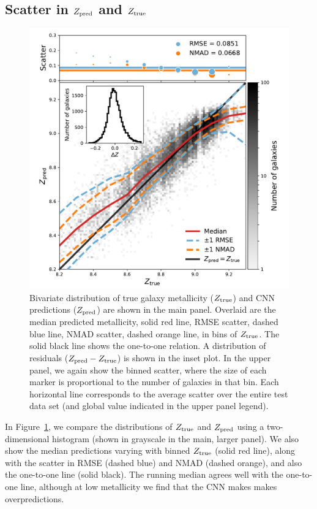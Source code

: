 \documentclass[fleqn,usenatbib]{mnras}
\begin{document}
\subsection{Scatter in $Z_{\rm pred}$ and $Z_{\rm true}$}
\begin{figure}
	\includegraphics[width=\columnwidth]{02-prediction_summary.pdf}
	\caption{\label{fig:predicting-metallicity}
		Bivariate distribution of true galaxy metallicity ($Z_{\rm true}$) and CNN predictions ($Z_{\rm pred}$) are shown in the main panel. Overlaid are the median predicted metallicity, solid red line, RMSE scatter, dashed blue line, NMAD scatter, dashed orange line, in bins of $Z_{\rm true}$. The solid black line shows the one-to-one relation. A distribution of residuals ($Z_{\rm pred} - Z_{\rm true}$) is shown in the inset plot. In the upper panel, we again show the binned scatter, where the size of each marker is proportional to the number of galaxies in that bin. Each horizontal line corresponds to the average scatter over the entire test data set (and global value indicated in the upper panel legend).}
\end{figure}

In Figure~\ref{fig:predicting-metallicity}, we compare the distributions of $Z_{\rm true}$ and $Z_{\rm pred}$ using a two-dimensional histogram (shown in grayscale in the main, larger panel). We also show the median predictions varying with binned $Z_{\rm true}$ (solid red line), along with the scatter in RMSE (dashed blue) and NMAD (dashed orange), and also the one-to-one line (solid black). The running median agrees well with the one-to-one line, although at low metallicity we find that the CNN makes makes overpredictions.
\end{document}
